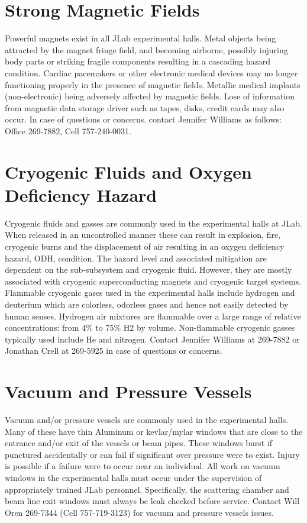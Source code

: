 \section{Strong Magnetic Fields}

	Powerful magnets exist in all JLab experimental halls. Metal objects being attracted 
by the magnet fringe field, and becoming airborne, possibly injuring body parts or striking 
fragile components resulting in a cascading hazard condition. Cardiac pacemakers or other 
electronic medical devices may no longer functioning properly in the presence of magnetic fields. 
Metallic medical implants (non-electronic) being adversely affected by magnetic fields. Lose of 
information from magnetic data storage driver such as tapes, disks, credit cards may also occur. 
In case of questions or concerns.
contact Jennifer Williams as follows: Office 269-7882, Cell 757-240-0031.

\section{Cryogenic Fluids and Oxygen Deficiency Hazard}

	Cryogenic fluids and gasses are commonly used in the experimental halls at JLab. 
When released in an uncontrolled manner these can result in explosion, fire, cryogenic 
burns and the displacement of air resulting in an oxygen deficiency hazard, ODH, condition. The hazard level and 
associated mitigation are dependent on the sub-subsystem and cryogenic fluid. However, 
they are mostly associated with cryogenic superconducting magnets and cryogenic target systems. 
Flammable cryogenic gases used in the experimental halls include hydrogen and deuterium which 
are colorless, odorless gases and hence not easily detected by human senses. Hydrogen air 
mixtures are flammable over a large range of relative concentrations: from 4\% to 75\% H2 by volume. 
Non-flammable cryogenic gasses typically used include He and nitrogen.  Contact Jennifer Williams
at 269-7882 or Jonathan Crell at 269-5925 in case of questions or concerns.   

\section{Vacuum and Pressure Vessels}

	Vacuum and/or pressure vessels are commonly used in the experimental halls. Many 
of these have thin Aluminum or kevlar/mylar windows that are close to the entrance 
and/or exit of the vessels or beam pipes. These windows burst if punctured accidentally 
or can fail if significant over pressure were to exist. Injury is possible if a failure 
were to occur near an individual. All work on vacuum windows in the experimental halls 
must occur under the supervision of appropriately trained JLab personnel. Specifically, 
the scattering chamber and beam line exit windows must always be leak checked before service. 
Contact Will Oren 269-7344 (Cell 757-719-3123) for vacuum and pressure vessels issues.

